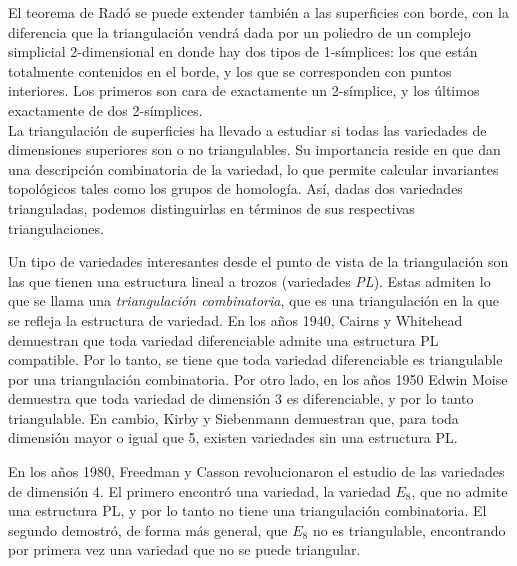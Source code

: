 \documentclass[10pt]{report}
\theoremstyle{definition}
\begin{document}
El teorema de Radó se puede extender también a las superficies con borde, con la diferencia que la triangulación vendrá dada por un poliedro de un complejo simplicial 2-dimensional en donde hay dos tipos de 1-símplices: los que están totalmente contenidos en el borde, y los que se corresponden con puntos interiores. Los primeros son cara de exactamente un 2-símplice, y los últimos exactamente de dos 2-símplices.\\


La triangulación de superficies ha llevado a estudiar si todas las variedades de dimensiones superiores son o no triangulables. Su importancia reside en que dan una descripción combinatoria de la variedad, lo que permite calcular invariantes topológicos tales como los grupos de homología. Así, dadas dos variedades trianguladas, podemos distinguirlas en términos de sus respectivas triangulaciones.

Un tipo de variedades interesantes desde el punto de vista de la triangulación son las que tienen una estructura lineal a trozos (variedades \textit{PL}). Estas admiten lo que se llama una \textit{triangulación combinatoria}, que es una triangulación en la que se refleja la estructura de variedad. En los años 1940, Cairns y Whitehead \cite{cairns} demuestran que toda variedad diferenciable admite una estructura PL compatible.
Por lo tanto, se tiene que toda variedad diferenciable es triangulable por una triangulación combinatoria.
Por otro lado, en los años 1950 Edwin Moise \cite{moise} demuestra que toda variedad de dimensión 3 es diferenciable, y por lo tanto triangulable. En cambio, Kirby y Siebenmann \cite{kirby} demuestran que, para toda dimensión mayor o igual que 5, existen variedades sin una estructura PL. 

En los años 1980, Freedman y Casson revolucionaron el estudio de las variedades de dimensión 4. El primero \cite{freedman} encontró una variedad, la variedad $E_8$, que no admite una estructura PL, y por lo tanto no tiene una triangulación combinatoria. El segundo \cite{casson} demostró, de forma más general, que $E_8$ no es triangulable, encontrando por primera vez una variedad que no se puede triangular.
\end{document}
